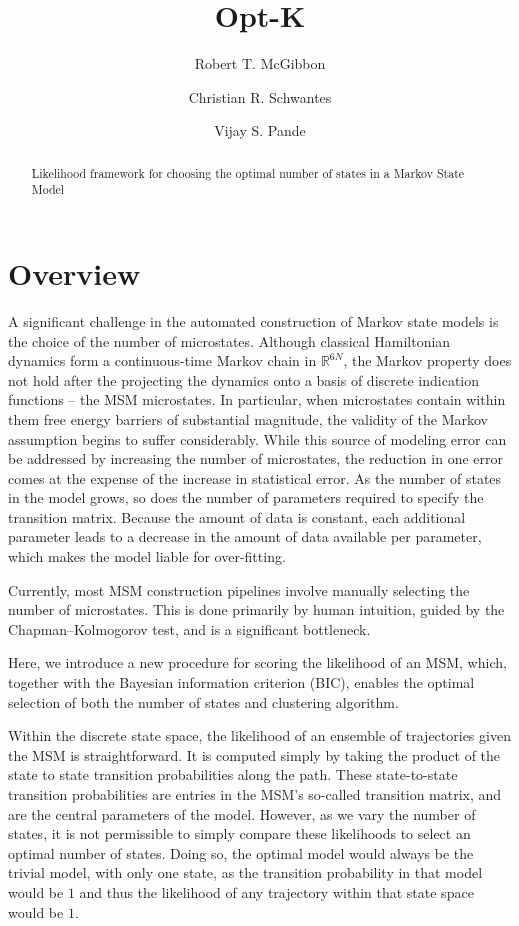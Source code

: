 \documentclass[twocolumn,floatfix,nofootinbib,aps]{revtex4-1}
\begin{document}
\title{Opt-K}
\author{Robert T. McGibbon}
\author{Christian R. Schwantes}
\author{Vijay S. Pande}

\begin{abstract}
Likelihood framework for choosing the optimal number of states in a
Markov State Model
\end{abstract}

\maketitle

\section{Overview}

A significant challenge in the automated construction of Markov state
models is the choice of the number of microstates. Although classical Hamiltonian dynamics form a continuous-time Markov chain in $\mathbb{R}^{6N}$, the Markov property does not hold after the projecting the dynamics onto a basis of discrete indication functions -- the MSM microstates. In particular, when microstates contain within them free energy barriers of substantial magnitude, the validity of the Markov assumption begins to suffer considerably. While this source of modeling error can be addressed by increasing the number of microstates, the reduction in one error comes at the expense of the increase in statistical error. As the number of states in the model grows, so does the number of parameters required to specify the transition matrix. Because the amount of data is constant, each additional parameter leads to a decrease in the amount of data available per
parameter, which makes the model liable for over-fitting.

Currently, most MSM construction pipelines involve manually selecting the number of microstates. This is done primarily by human intuition, guided by the Chapman–Kolmogorov test, and is a significant bottleneck.

Here, we introduce a new procedure for scoring the likelihood of an MSM, which, together with the Bayesian information criterion (BIC), enables the optimal selection of both the number of states and clustering algorithm.

Within the discrete state space, the likelihood of an ensemble of
trajectories given the MSM is straightforward. It is computed simply by taking the product of the state to state transition probabilities along the path.
These state-to-state transition probabilities are entries in the MSM's so-called transition matrix, and are the central parameters of the model. However, as we vary the number of states, it is not permissible to simply compare these likelihoods to select an optimal number of states. Doing so, the optimal model would always be the trivial model, with only one state, as the transition probability in that model would be $1$ and thus the likelihood of any trajectory within that state space would be $1$.
\end{document}
